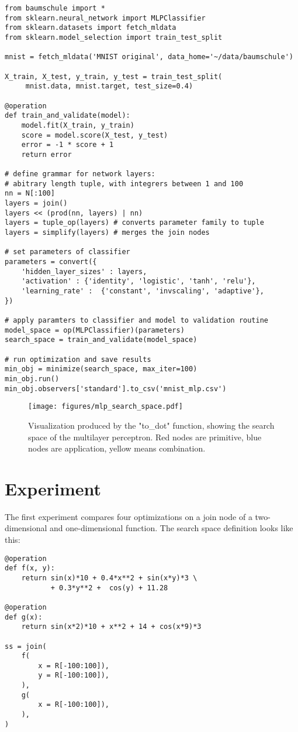 \documentclass[english]{article}
\begin{document}
\begin{verbatim}
from baumschule import *
from sklearn.neural_network import MLPClassifier
from sklearn.datasets import fetch_mldata
from sklearn.model_selection import train_test_split

mnist = fetch_mldata('MNIST original', data_home='~/data/baumschule')

X_train, X_test, y_train, y_test = train_test_split(
     mnist.data, mnist.target, test_size=0.4)

@operation
def train_and_validate(model):
    model.fit(X_train, y_train)
    score = model.score(X_test, y_test)
    error = -1 * score + 1
    return error

# define grammar for network layers:
# abitrary length tuple, with integrers between 1 and 100
nn = N[:100]
layers = join()
layers << (prod(nn, layers) | nn)
layers = tuple_op(layers) # converts parameter family to tuple
layers = simplify(layers) # merges the join nodes

# set parameters of classifier
parameters = convert({
    'hidden_layer_sizes' : layers,
    'activation' : {'identity', 'logistic', 'tanh', 'relu'},
    'learning_rate' :  {'constant', 'invscaling', 'adaptive'},
})

# apply paramters to classifier and model to validation routine
model_space = op(MLPClassifier)(parameters)
search_space = train_and_validate(model_space)

# run optimization and save results
min_obj = minimize(search_space, max_iter=100)
min_obj.run()
min_obj.observers['standard'].to_csv('mnist_mlp.csv')

\end{verbatim}

\begin{figure}
  \texttt{[image: figures/mlp\_search\_space.pdf]}
  \caption{Visualization produced by the "to\_dot" function, showing the search space of the multilayer perceptron. Red nodes are primitive, blue nodes are application, yellow means combination.}
  \label{mlp_search_space}
\end{figure}


\section{Experiment}

The first experiment compares four optimizations on a join node of a two-dimensional and one-dimensional function. The search space definition looks like this:
\begin{verbatim}
@operation
def f(x, y):
    return sin(x)*10 + 0.4*x**2 + sin(x*y)*3 \
           + 0.3*y**2 +  cos(y) + 11.28

@operation
def g(x):
    return sin(x*2)*10 + x**2 + 14 + cos(x*9)*3

ss = join(
    f(
        x = R[-100:100]),
        y = R[-100:100]),
    ),
    g(
        x = R[-100:100]),
    ),
)
\end{verbatim}
\end{document}
